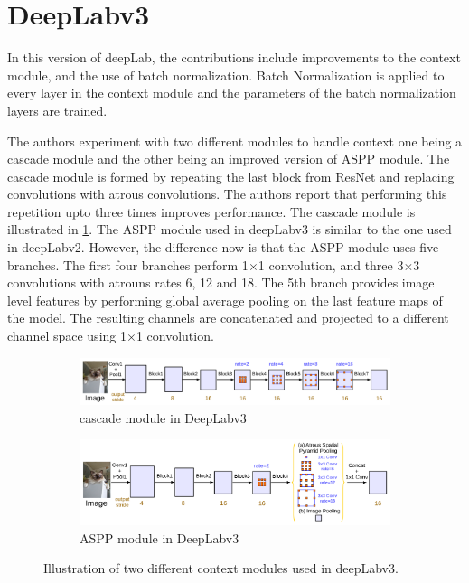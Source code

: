 \section{DeepLabv3}
In this version of deepLab, the contributions include improvements to the context module, and the use of batch normalization. Batch Normalization is applied to every layer in the context module and the parameters of the batch normalization layers are trained.

The authors experiment with two different modules to handle context one being a cascade module and the other being an improved version of ASPP module. The cascade module is formed by repeating the last block from ResNet and replacing convolutions with atrous convolutions. The authors report that performing this repetition upto three times improves performance. 	The cascade module is illustrated in \ref{Fig:contextmodulea}. The ASPP module used in deepLabv3 is similar to the one used in deepLabv2. However, the difference now is that the ASPP module uses five branches. The first four branches perform 1$\times$1 convolution, and three 3$\times$3 convolutions with atrouns rates 6, 12 and 18. The 5th branch provides image level features by performing global average pooling on the last feature maps of the model. The resulting channels are concatenated and projected to a different channel space using 1$\times$1 convolution.

	\begin{figure}[!htb]
		\begin{subfigure}{1\textwidth}
			\centering
			\includegraphics[width=1\linewidth]{images/cascade_module}
			\caption{cascade module in DeepLabv3}
			\label{Fig:contextmodulea}
		\end{subfigure}
		\begin{subfigure}{1\textwidth}
			\centering
			\includegraphics[width=1\linewidth]{images/aspp_module}
			\caption{ASPP module in DeepLabv3}
			\label{Fig:contextmoduleb}
		\end{subfigure}
		\caption{Illustration of two different context modules used in deepLabv3.}
		\label{Fig:contextmodule}
	\end{figure}

